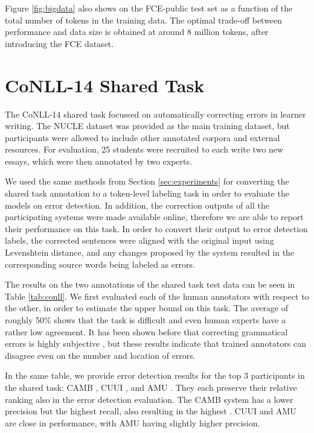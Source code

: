 \documentclass[11pt]{article}
\begin{document}
Figure \ref{fig:bigdata} also shows  on the FCE-public test set as a function of the total number of tokens in the training data. The optimal trade-off between performance and data size is obtained at around 8 million tokens, after introducing the FCE dataset. 






\section{CoNLL-14 Shared Task}
\label{sec:conll}








The CoNLL-14 shared task \cite{Ng2013a} focussed on automatically correcting errors in learner writing. The NUCLE dataset was provided as the main training dataset, but participants were allowed to include other annotated corpora and external resources. For evaluation, 25 students were recruited to each write two new essays, which were then annotated by two experts.

We used the same methods from Section \ref{sec:experiments} for converting the shared task annotation to a token-level labeling task in order to evaluate the models on error detection. In addition, the correction outputs of all the participating systems were made available online, therefore we are able to report their performance on this task. 
In order to convert their output to error detection labels, the corrected sentences were aligned with the original input using Levenshtein distance, and any changes proposed by the system resulted in the corresponding source words being labeled as errors.

The results on the two annotations of the shared task test data can be seen in Table \ref{tab:conll}.
We first evaluated each of the human annotators with respect to the other, in order to estimate the upper bound on this task. The average  of roughly 50\% shows that the task is difficult and even human experts have a rather low agreement. It has been shown before that correcting grammatical errors is highly subjective \cite{Bryant2015}, but these results indicate that trained annotators can disagree even on the number and location of errors.

In the same table, we provide error detection results for the top 3 participants in the shared task: CAMB \cite{Felice2014}, CUUI \cite{Rozovskaya2014}, and AMU \cite{Junczys-Dowmunt2014}. They each preserve their relative ranking also in the error detection evaluation. The CAMB system has a lower precision but the highest recall, also resulting in the highest . CUUI and AMU are close in performance, with AMU having slightly higher precision. 
\end{document}
